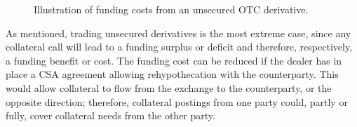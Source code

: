 \documentclass[main.tex]{subfiles}
\begin{document}
        \begin{figure}
            \centering
            \resizebox{\textwidth}{!}{%
            \begin{tikzpicture}
                
            \end{tikzpicture}        
            }   
            \caption{Illustration of funding costs from an unsecured OTC derivative.}
            \label{fig:funding-costs-unsecured-derivative}
        \end{figure}

        As mentioned, trading unsecured derivatives is the most extreme case,
        since any collateral call will lead to a funding surplus or deficit 
        and therefore, respectively, a funding benefit or cost.
        The funding cost can be reduced if the dealer has in place 
        a CSA agreement allowing rehypothecation with the counterparty.
        This would allow collateral to flow from the exchange to the counterparty, 
        or the opposite direction;
        therefore, collateral postings from one party could, partly or fully, 
        cover collateral needs from the other party.
\end{document}
